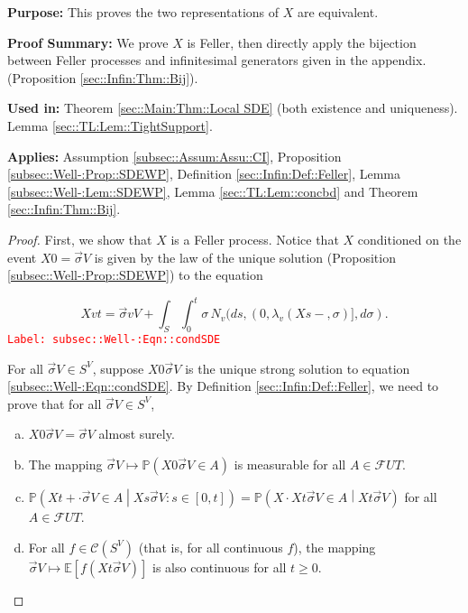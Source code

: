 \documentclass[12pt]{article}
\newcommand{\mb}{\mathbb}
\newcommand{\mc}{\mathcal}
\newcommand{\tr}{\textcolor{red}}
\newcommand{\labe}[1]{\tr{\texttt{Label: #1}}}
\newcommand{\purpose}{\textbf{Purpose: }}
\newcommand{\pfsum}{\textbf{Proof Summary: }}
\newcommand{\usein}{\textbf{Used in: }}
\newcommand{\app}{\textbf{Applies: }}
\newcommand{\pr}{\mb{P}}							%
\newcommand{\ex}[1]{\mb{E}\left[#1\right]}			%
\renewcommand{\v}{v}							%
\renewcommand{\U}{U}							%
\renewcommand{\S}{S}							%
\newcommand{\s}{\sigma}							%
\newcommand{\sv}{\vec{\s}}						%
\newcommand{\T}{T}								%
\renewcommand{\t}{t}							%
\renewcommand{\tt}{s}							%
\newcommand{\F}{\mc{F}}							%
\newcommand{\X}{X}								%
\newcommand{\poiss}[1]{N_{#1}}						%
\newcommand{\XState}[1]{\S^{#1}}				%
\newcommand{\rate}[1]{\lambda_{#1}}					%
\newcommand{\cont}{\mc{C}}							%
\begin{document}
\purpose This proves the two representations of \(\X{}{}\) are equivalent.

\pfsum We prove \(\X{}{}\) is Feller, then directly apply the bijection between Feller processes and infinitesimal generators given in the appendix. (Proposition \ref{sec::Infin:Thm::Bij}).

\usein Theorem \ref{sec::Main:Thm::Local SDE} (both existence and uniqueness). Lemma \ref{sec::TL:Lem::TightSupport}.

\app Assumption \ref{subsec::Assum:Assu::CI}, Proposition \ref{subsec::Well-:Prop::SDEWP}, Definition \ref{sec::Infin:Def::Feller}, Lemma \ref{subsec::Well-:Lem::SDEWP}, Lemma \ref{sec::TL:Lem::concbd} and Theorem \ref{sec::Infin:Thm::Bij}.

\begin{proof}
First, we show that \(\X{}{}\) is a Feller process. Notice that \(\X{}{}\) conditioned on the event \(\X{}{0} = \sv{}{ V}\) is given by the law of the unique solution (Proposition \ref{subsec::Well-:Prop::SDEWP}) to the equation

\begin{equation}
\X{\v}{\t} = \sv{\v}{ V} + \int_\S\int_0^\t \s\,\poiss{\v}(d\tt,(0,\rate{\v}(\X{}{\tt-},\s)],d\s).
\label{subsec::Well-:Eqn::condSDE}
\end{equation}
\labe{subsec::Well-:Eqn::condSDE}

For all \(\sv{}{ V}\in\S^ V\), suppose \(\X{}{0}{\sv{}{ V}}\) is the unique strong solution to equation \eqref{subsec::Well-:Eqn::condSDE}. By Definition \ref{sec::Infin:Def::Feller}, we need to prove that for all \(\sv{}{ V}\in \S^ V\),

\begin{enumerate}[(a)]
\item \(\X{}{0}{\sv{}{ V}} = \sv{}{ V}\) almost surely.

\item The mapping \(\sv{}{ V}\mapsto \pr\left(\X{}{0}{\sv{}{ V}}\in A\right)\) is measurable for all \(A\in \F{\U}{\T}\).

\item \(\pr\left(\X{}{\t+\cdot}{\sv{}{ V}}\in A\middle|\X{}{\tt}{\sv{}{ V}}:\tt \in [0,\t]\right) = \pr\left(\X{}{\cdot}{\X{}{\t}{\sv{}{ V}}} \in A\middle| \X{}{\t}{\sv{}{ V}} \right)\) for all \(A \in \F{\U}{\T}\).

\item For all \(f \in \cont(\S^ V)\) (that is, for all continuous \(f\)), the mapping \(\sv{}{ V}\mapsto \ex{f(\X{}{\t}{\sv{}{ V}})}\) is also continuous for all \(t\geq 0\).
\end{enumerate}


\end{proof}
\end{document}
